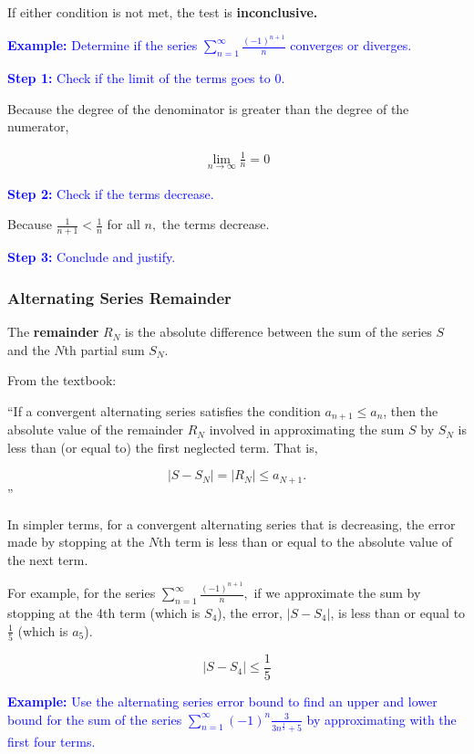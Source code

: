 \documentclass[letterpaper, 12pt]{article}
\newcommand{\example}[1]{\textcolor{blue}{\textbf{Example:} #1}}
\newcommand{\step}[2]{\textcolor{blue}{\textbf{Step #1:} #2}}
\begin{document}
If either condition is not met, the test is \textbf{inconclusive.}

\example{Determine if the series $\displaystyle \sum_{n=1}^\infty \frac{(-1)^{n+1}}{n}$ converges or diverges.}

\step{1}{Check if the limit of the terms goes to 0.}

Because the degree of the denominator is greater than the degree of the numerator,

\begin{gather*}
\lim_{n \to \infty} \frac{1}{n} = 0
\end{gather*}

\step{2}{Check if the terms decrease.}

Because $\displaystyle \frac{1}{n+1} < \frac{1}{n}$ for all $n,$ the terms decrease.

\step{3}{Conclude and justify.}


\subsubsection*{Alternating Series Remainder}

The \textbf{remainder} $R_N$ is the absolute difference between the sum of the series $S$ and the $N$th partial sum $S_N$.

From the textbook:

``If a convergent alternating series satisfies the condition $a_{n+1} \leq a_n$, then the absolute value of the remainder $R_N$ involved in approximating the sum $S$ by $S_N$ is less than (or equal to) the first neglected term. That is,

$$|S-S_N| = |R_N| \leq a_{N+1}.$$''

In simpler terms, for a convergent alternating series that is decreasing, the error made by stopping at the $N$th term is less than or equal to the absolute value of the next term.

For example, for the series $\displaystyle \sum_{n=1}^\infty \frac{(-1)^{n+1}}{n},$ if we approximate the sum by stopping at the 4th term (which is $S_4$), the error, $|S-S_4|$, is less than or equal to $\displaystyle \frac{1}{5}$ (which is $a_5$).

$$|S - S_4| \leq \frac{1}{5}$$

\example{Use the alternating series error bound to find an upper and lower bound for the sum of the series $\displaystyle \sum_{n=1}^{\infty} (-1)^n \frac{3}{3n^\frac{1}{3}+5}$ by approximating with the first four terms.}
\end{document}
